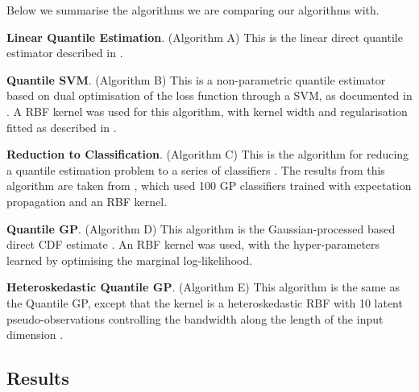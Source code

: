 \documentclass[twoside]{article} \usepackage{aistats2017}
\theoremstyle{definition}
\theoremstyle{theorem}
\begin{document}
		Below we summarise the algorithms we are comparing our algorithms with.
		
		\textbf{Linear Quantile Estimation}. (Algorithm A) This is the linear direct	quantile estimator described in \cite{koenker1978regression}.
		
		\textbf{Quantile SVM}. (Algorithm B) This is a non-parametric quantile estimator based on dual optimisation of the loss function through a SVM, as documented in \cite{takeuchi2006nonparametric}. A RBF kernel was used for this algorithm, with kernel width and regularisation fitted as described in \cite{Quadrianto2009}.

		\textbf{Reduction to Classification}. (Algorithm C) This is the algorithm for reducing a quantile estimation problem to a series of classifiers \citep{Langford2006}. The results from this algorithm are taken from \cite{Quadrianto2009}, which used 100 GP classifiers trained with expectation propagation and an RBF kernel.
		
		\textbf{Quantile GP}. (Algorithm D) This algorithm is the Gaussian-processed based direct CDF estimate \cite{Quadrianto2009}. An RBF kernel was used, with the hyper-parameters learned by optimising the marginal log-likelihood.
		
		\textbf{Heteroskedastic Quantile GP}. (Algorithm E) This algorithm is the same as the Quantile GP, except that the kernel is a heteroskedastic RBF with 10 latent pseudo-observations controlling the bandwidth along the length of the input dimension \citep{Quadrianto2009}. 
		
	\subsection{Results}
	\label{sec:experiments:results}
	
\end{document}
